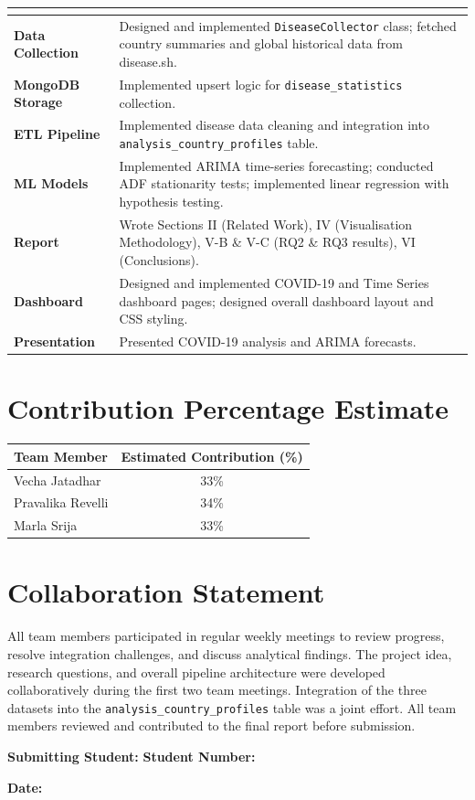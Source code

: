 \documentclass[12pt, a4paper]{article}
\begin{document}
\begin{tabular}{>{\bfseries}p{4cm} p{10cm}}
\midrule
\multicolumn{2}{l}{\textbf{Marla Srija (X24295256)}} \\
\midrule
Data Collection & Designed and implemented \texttt{DiseaseCollector} class;
  fetched country summaries and global historical data from disease.sh. \\
MongoDB Storage & Implemented upsert logic for \texttt{disease\_statistics}
  collection. \\
ETL Pipeline & Implemented disease data cleaning and integration into
  \texttt{analysis\_country\_profiles} table. \\
ML Models & Implemented ARIMA time-series forecasting; conducted ADF
  stationarity tests; implemented linear regression with hypothesis testing. \\
Report & Wrote Sections II (Related Work), IV (Visualisation Methodology),
  V-B \& V-C (RQ2 \& RQ3 results), VI (Conclusions). \\
Dashboard & Designed and implemented COVID-19 and Time Series dashboard pages;
  designed overall dashboard layout and CSS styling. \\
Presentation & Presented COVID-19 analysis and ARIMA forecasts. \\
\bottomrule
\end{tabular}

\vspace{20pt}
\section*{Contribution Percentage Estimate}
\begin{tabular}{lc}
\toprule
\textbf{Team Member} & \textbf{Estimated Contribution (\%)} \\
\midrule
Vecha Jatadhar    & 33\% \\
Pravalika Revelli & 34\% \\
Marla Srija       & 33\% \\
\bottomrule
\end{tabular}

\vspace{16pt}
\section*{Collaboration Statement}
All team members participated in regular weekly meetings to review progress,
resolve integration challenges, and discuss analytical findings. The project
idea, research questions, and overall pipeline architecture were developed
collaboratively during the first two team meetings. Integration of the three
datasets into the \texttt{analysis\_country\_profiles} table was a joint effort.
All team members reviewed and contributed to the final report before submission.

\vspace{20pt}
\noindent\textbf{Submitting Student:} \underline{\hspace{5cm}}
\quad \textbf{Student Number:} \underline{\hspace{3cm}}

\noindent\textbf{Date:} \underline{\hspace{4cm}}
\end{document}
